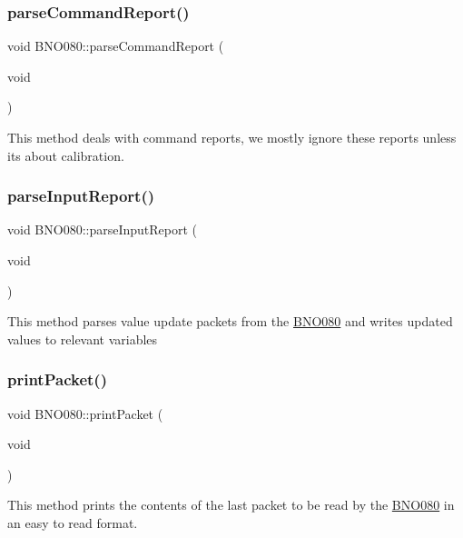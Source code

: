 \subsubsection{\texorpdfstring{parseCommandReport()}{parseCommandReport()}}
{\footnotesize\ttfamily void B\+N\+O080\+::parse\+Command\+Report (\begin{DoxyParamCaption}\item[{void}]{ }\end{DoxyParamCaption})}

This method deals with command reports, we mostly ignore these reports unless it\textquotesingle{}s about calibration. \mbox{\label{classBNO080_a960b884f27623823999a69b2c3fa9925}} 
\subsubsection{\texorpdfstring{parseInputReport()}{parseInputReport()}}
{\footnotesize\ttfamily void B\+N\+O080\+::parse\+Input\+Report (\begin{DoxyParamCaption}\item[{void}]{ }\end{DoxyParamCaption})}

This method parses value update packets from the \mbox{\hyperlink{classBNO080}{B\+N\+O080}} and writes updated values to relevant variables \mbox{\label{classBNO080_a5d0a36bd71601dd845090be70640c206}} 
\subsubsection{\texorpdfstring{printPacket()}{printPacket()}}
{\footnotesize\ttfamily void B\+N\+O080\+::print\+Packet (\begin{DoxyParamCaption}\item[{void}]{ }\end{DoxyParamCaption})}

This method prints the contents of the last packet to be read by the \mbox{\hyperlink{classBNO080}{B\+N\+O080}} in an easy to read format. \mbox{\label{classBNO080_a387ca93b51c1683425b051a35850053f}} 
